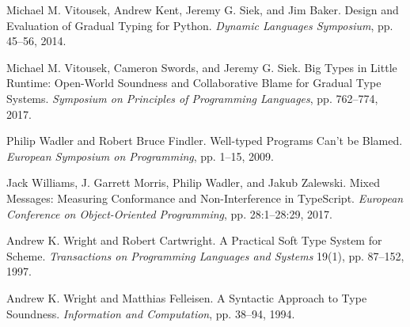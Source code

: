 \documentclass[screen=true, 10pt, acmsmall]{acmart}
\newenvironment{SingleColumn}{\begin{list}{}{\topsep=0pt\partopsep=0pt%
\listparindent=0pt\itemindent=0pt\labelwidth=0pt\leftmargin=0pt\rightmargin=0pt%
\itemsep=0pt\parsep=0pt}\item}{\end{list}}
\newenvironment{AutoBibliography}{\begin{small}}{\end{small}}
\newcommand{\Autobibentry}[1]{\hspace{0.05\linewidth}\parbox[t]{0.95\linewidth}{\parindent=-0.05\linewidth#1\vspace{1.0ex}}}
\begin{document}
\begin{AutoBibliography}
\begin{SingleColumn}
\label{t:x28autobib_x22Michael_Mx2e_Vitousekx2c_Andrew_Kentx2c_Jeremy_Gx2e_Siekx2c_and_Jim_BakerDesign_and_Evaluation_of_Gradual_Typing_for_PythonDynamic_Languages_Symposiumx2c_ppx2e_45x2dx2d562014x22x29}\Autobibentry{Michael M. Vitousek, Andrew Kent, Jeremy G. Siek, and Jim Baker. Design and Evaluation of Gradual Typing for Python. \textit{Dynamic Languages Symposium}, pp. 45{--}56, 2014.}

\label{t:x28autobib_x22Michael_Mx2e_Vitousekx2c_Cameron_Swordsx2c_and_Jeremy_Gx2e_SiekBig_Types_in_Little_Runtimex3a_Openx2dWorld_Soundness_and_Collaborative_Blame_for_Gradual_Type_SystemsSymposium_on_Principles_of_Programming_Languagesx2c_ppx2e_762x2dx2d7742017x22x29}\Autobibentry{Michael M. Vitousek, Cameron Swords, and Jeremy G. Siek. Big Types in Little Runtime: Open{-}World Soundness and Collaborative Blame for Gradual Type Systems. \textit{Symposium on Principles of Programming Languages}, pp. 762{--}774, 2017.}

\label{t:x28autobib_x22Philip_Wadler_and_Robert_Bruce_FindlerWellx2dtyped_Programs_Canx27t_be_BlamedEuropean_Symposium_on_Programmingx2c_ppx2e_1x2dx2d152009x22x29}\Autobibentry{Philip Wadler and Robert Bruce Findler. Well{-}typed Programs Can{'}t be Blamed. \textit{European Symposium on Programming}, pp. 1{--}15, 2009.}

\label{t:x28autobib_x22Jack_Williamsx2c_Jx2e_Garrett_Morrisx2c_Philip_Wadlerx2c_and_Jakub_ZalewskiMixed_Messagesx3a_Measuring_Conformance_and_Nonx2dInterference_in_TypeScriptEuropean_Conference_on_Objectx2dOriented_Programmingx2c_ppx2e_28x3a1x2dx2d28x3a292017x22x29}\Autobibentry{Jack Williams, J. Garrett Morris, Philip Wadler, and Jakub Zalewski. Mixed Messages: Measuring Conformance and Non{-}Interference in TypeScript. \textit{European Conference on Object{-}Oriented Programming}, pp. 28:1{--}28:29, 2017.}

\label{t:x28autobib_x22Andrew_Kx2e_Wright_and_Robert_CartwrightA_Practical_Soft_Type_System_for_SchemeTransactions_on_Programming_Languages_and_Systems_19x281x29x2c_ppx2e_87x2dx2d1521997x22x29}\Autobibentry{Andrew K. Wright and Robert Cartwright. A Practical Soft Type System for Scheme. \textit{Transactions on Programming Languages and Systems} 19(1), pp. 87{--}152, 1997.}

\label{t:x28autobib_x22Andrew_Kx2e_Wright_and_Matthias_FelleisenA_Syntactic_Approach_to_Type_SoundnessInformation_and_Computationx2c_ppx2e_38x2dx2d941994x22x29}\Autobibentry{Andrew K. Wright and Matthias Felleisen. A Syntactic Approach to Type Soundness. \textit{Information and Computation}, pp. 38{--}94, 1994.}


\end{SingleColumn}
\end{AutoBibliography}
\end{document}
